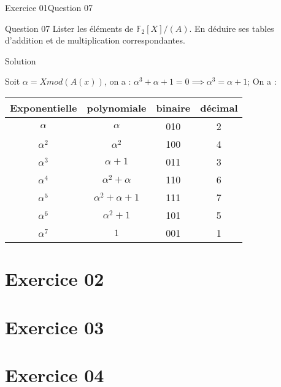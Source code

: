 \documentclass[10pt]{beamer}
\begin{document}
    \begin{frame}{Exercice 01}{Question 07}
        \begin{alertblock}{Question 07}
            Lister les éléments de $\mathbb{F}_2[X]/(A)$. En déduire ses tables d'addition et de multiplication correspondantes.
        \end{alertblock}
        \begin{exampleblock}{Solution}
            \begin{itemize}
                Soit $\alpha = X mod(A(x))$, on a : $\alpha^3 + \alpha + 1 = 0 \implies \alpha^3 = \alpha + 1$; 
                On a : \pause
                \begin{tabular}{c|c|c|c}
                    Exponentielle & polynomiale & binaire & décimal \\
                    \hline
                    $\alpha$ & $\alpha$ & 010 & 2 \\
                    \hline
                    $\alpha^2$ & $\alpha^2$ & 100 & 4 \\
                    \hline
                    $\alpha^3$ & $\alpha + 1 $ & 011 & 3 \\
                    \hline
                    $\alpha^4$ & $\alpha^2 + \alpha $ & 110 & 6 \\
                    \hline
                    $\alpha^5$ & $\alpha^2 + \alpha + 1 $ & 111 & 7 \\
                    \hline
                    $\alpha^6$ & $\alpha^2 + 1 $ & 101 & 5 \\
                    \hline
                    $\alpha^7$ & $1$ & 001 & 1 \\
                    \hline
                \end{tabular}
            \end{itemize}
        \end{exampleblock}
    \end{frame}
    

    \section{Exercice 02}
    \section{Exercice 03}
 
    \section{Exercice 04}
  
\end{document}
